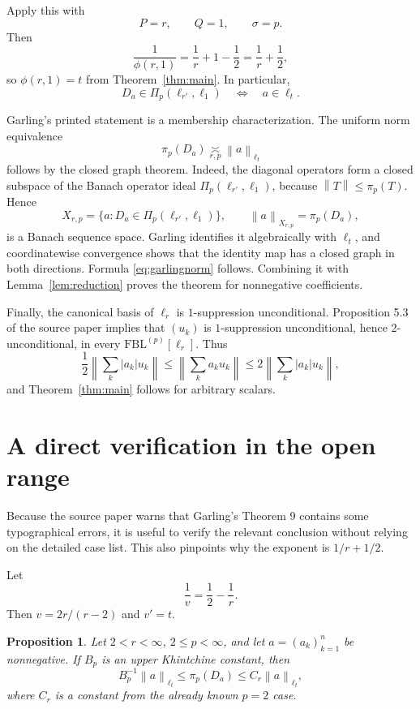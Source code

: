 \documentclass[11pt]{article}
\newtheorem{proposition}[theorem]{Proposition}
\theoremstyle{remark}
\newcommand{\FBL}{\mathrm{FBL}}
\newcommand{\norm}[1]{\left\lVert #1\right\rVert}
\newcommand{\abs}[1]{\left\lvert #1\right\rvert}
\newcommand{\asympC}[1]{\mathrel{\underset{#1}{\asymp}}}
\begin{document}
Apply this with
\[
  P=r,\qquad Q=1,\qquad \sigma=p.
\]
Then
\[
 \frac1{\phi(r,1)}
 =\frac1r+1-\frac12
 =\frac1r+\frac12,
\]
so $\phi(r,1)=t$ from Theorem~\ref{thm:main}.  In particular,
\[
 D_a\in\Pi_p(\ell_{r'},\ell_1)
 \quad\Longleftrightarrow\quad
 a\in\ell_t.
\]

Garling's printed statement is a membership characterization.  The uniform
norm equivalence
\[
 \pi_p(D_a)\asympC{r,p}\norm{a}_{\ell_t}
 \label{eq:garlingnorm}
 \tag{3.1}
\]
follows by the closed graph theorem.  Indeed, the diagonal operators form a
closed subspace of the Banach operator ideal $\Pi_p(\ell_{r'},\ell_1)$,
because $\norm{T}\le\pi_p(T)$.  Hence
\[
 X_{r,p}=\{a:D_a\in\Pi_p(\ell_{r'},\ell_1)\},
 \qquad \norm{a}_{X_{r,p}}=\pi_p(D_a),
\]
is a Banach sequence space.  Garling identifies it algebraically with
$\ell_t$, and coordinatewise convergence shows that the identity map has a
closed graph in both directions.  Formula \eqref{eq:garlingnorm} follows.
Combining it with Lemma~\ref{lem:reduction} proves the theorem for
nonnegative coefficients.

Finally, the canonical basis of $\ell_r$ is $1$-suppression unconditional.
Proposition 5.3 of the source paper implies that $(u_k)$ is
$1$-suppression unconditional, hence $2$-unconditional, in every
$\FBL^{(p)}[\ell_r]$.  Thus
\[
 \frac12\norm{\sum_k \abs{a_k}u_k}
 \le \norm{\sum_k a_ku_k}
 \le 2\norm{\sum_k \abs{a_k}u_k},
\]
and Theorem~\ref{thm:main} follows for arbitrary scalars.

\section{A direct verification in the open range}

Because the source paper warns that Garling's Theorem 9 contains some
typographical errors, it is useful to verify the relevant conclusion without
relying on the detailed case list.  This also pinpoints why the exponent is
$1/r+1/2$.

Let
\[
 \frac1v=\frac12-\frac1r.
\]
Then $v=2r/(r-2)$ and $v'=t$.

\begin{proposition}
\label{prop:direct}
Let $2<r<\infty$, $2\le p<\infty$, and let $a=(a_k)_{k=1}^n$ be
nonnegative.  If $B_p$ is an upper Khintchine constant, then
\[
 B_p^{-1}\norm{a}_{\ell_t}
 \le \pi_p(D_a)
 \le C_r\norm{a}_{\ell_t},
\]
where $C_r$ is a constant from the already known $p=2$ case.
\end{proposition}
\end{document}
